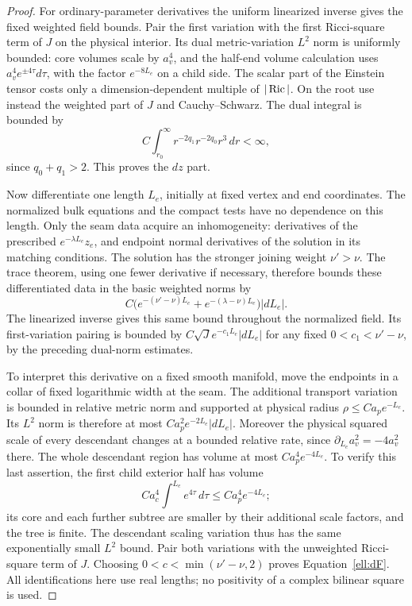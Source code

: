 \begin{proof}
For ordinary-parameter derivatives the uniform linearized
inverse gives the fixed weighted field bounds.  Pair the
first variation with the first Ricci-square term of $J$ on
the physical interior.  Its dual metric-variation $L^2$
norm is uniformly bounded: core volumes scale by $a_v^4$,
and the half-end volume calculation uses
$a_v^4e^{\pm4\tau}d\tau$, with the factor $e^{-8L_e}$ on
a child side.  The scalar part of the Einstein tensor costs
only a dimension-dependent multiple of $|\operatorname{Ric}|$.
On the root use instead the weighted part of $J$ and
Cauchy--Schwarz.  The dual integral is bounded by
\[
 C\int_{r_0}^{\infty}r^{-2q_1}r^{-2q_0}r^3\,dr<\infty,
\]
since $q_0+q_1>2$.  This proves the $dz$ part.

Now differentiate one length $L_e$, initially at fixed vertex
and end coordinates.  The normalized bulk equations and
the compact tests have no dependence on this length.  Only
the seam data acquire an inhomogeneity: derivatives of the
prescribed $e^{-\lambda L_e}z_e$, and endpoint normal
derivatives of the solution in its matching conditions.
The solution has the stronger joining weight $\nu'>\nu$.
The trace theorem, using one fewer derivative if necessary,
therefore bounds these differentiated data in the basic
weighted norms by
\[
 C\bigl(e^{-(\nu'-\nu)L_e}
             +e^{-(\lambda-\nu)L_e}\bigr)|dL_e|.
\]
The linearized inverse gives this same bound throughout
the normalized field.  Its first-variation pairing is
bounded by $C\sqrt J e^{-c_1L_e}|dL_e|$ for any fixed
$0<c_1<\nu'-\nu$, by the preceding dual-norm estimates.

To interpret this derivative on a fixed smooth manifold,
move the endpoints in a collar of fixed logarithmic width
at the seam.  The additional transport variation is bounded
in relative metric norm and supported at physical radius
$\rho\le Ca_pe^{-L_e}$.  Its $L^2$ norm is therefore at most
$Ca_p^2e^{-2L_e}|dL_e|$.  Moreover the physical squared scale
of every descendant changes at a bounded relative rate,
since $\partial_{L_e}a_v^2=-4a_v^2$ there.  The whole
descendant region has volume at most
$Ca_p^4e^{-4L_e}$.  To verify this last assertion, the first
child exterior half has volume
\[
 Ca_c^4\int^{L_e}e^{4\tau}\,d\tau
       \le Ca_p^4e^{-4L_e};
\]
its core and each further subtree are smaller by their
additional scale factors, and the tree is finite.  The
descendant scaling variation thus has the same exponentially
small $L^2$ bound.  Pair both variations with the unweighted
Ricci-square term of $J$.  Choosing
$0<c<\min(\nu'-\nu,2)$ proves
Equation~\eqref{ell:dF}.  All identifications here use real
lengths; no positivity of a complex bilinear square is used.
\end{proof}

